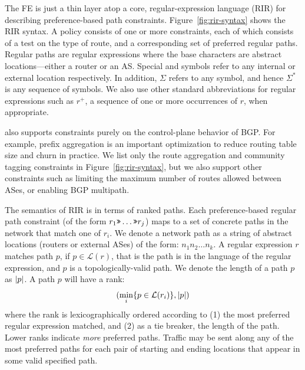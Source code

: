 The \sysname FE is just a thin layer atop a core, regular-expression language (RIR) for describing preference-based path constraints. 
Figure~\ref{fig:rir-syntax} shows the RIR syntax. A policy consists of one or more constraints, each of which consists of a test on the type of route, and a corresponding set of preferred regular paths. Regular paths are regular expressions where the base characters are abstract locations---either a router or an AS. Special \In{} and \Out{} symbols refer to any internal or external location respectively.  In addition, $\Sigma$ refers to any symbol, and hence $\Sigma^*$ is
any sequence of symbols.  We also use other standard abbreviations
for regular expressions such as $r^+$, a sequence of one or more occurrences
of $r$, when appropriate.

\sysname also supports constraints purely on the control-plane behavior of BGP. For example, prefix aggregation is an important optimization to reduce routing table size and churn in practice. 
We list only the route aggregation and community tagging constraints in Figure~\ref{fig:rir-syntax}, but we also support other constraints such as limiting the maximum number of routes allowed between ASes, or enabling BGP multipath.



The semantics of RIR is in terms of ranked paths. Each preference-based regular path constraint (of the form $r_1 \texttt{>>} \dots \texttt{>>} r_j$) maps to a set of concrete paths in the network that match one of $r_i$. We denote a network path as a string of abstract locations (routers or external ASes) of the form: $n_1 n_2 \dots n_k$. A regular expression $r$ matches path $p$, if $p \in \mathcal{L}(r)$, that is the path is in the language of the regular expression, and $p$ is a topologically-valid path. We denote the length of a path $p$ as $ \lvert p \rvert $. A path $p$ will have a rank:
$$(\min_i \{  p \in \mathcal{L}(r_i)  \} ,  \lvert p \rvert )$$
where the rank is lexicographically ordered according to (1) the most preferred regular expression matched, and (2) as a tie breaker, the length of the path. Lower ranks indicate \emph{more} preferred paths. Traffic may be sent along any of the most preferred paths for each pair of starting and ending locations that appear in some valid specified path.

